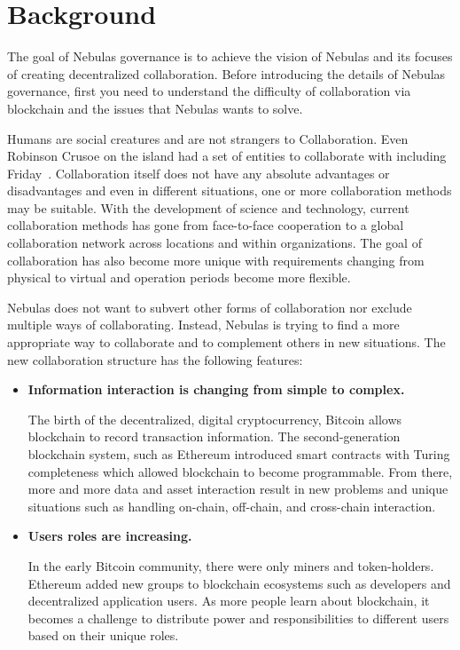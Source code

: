 \section{Background}

The goal of Nebulas governance is to achieve the vision of Nebulas and its focuses of creating decentralized collaboration. Before introducing the details of Nebulas governance, first you need to understand the difficulty of collaboration via blockchain and the issues that Nebulas wants to solve.

\label{background}

Humans are social creatures and are not strangers to Collaboration. Even Robinson Crusoe on the island had a set of entities to collaborate with including Friday~\cite{robinson}. Collaboration itself does not have any absolute advantages or disadvantages and even in different situations, one or more collaboration methods may be suitable. With the development of science and technology, current collaboration methods has gone from face-to-face cooperation to a global collaboration network across locations and within organizations. The goal of collaboration has also become more unique with requirements changing from physical to virtual and operation periods become more flexible.

Nebulas does not want to subvert other forms of collaboration nor exclude multiple ways of collaborating. Instead, Nebulas is trying to find a more appropriate way to collaborate and to complement others in new situations. The new collaboration structure has the following features:

\begin{itemize}
	\item \textbf{Information interaction is changing from simple to complex.}

	The birth of the decentralized, digital cryptocurrency, Bitcoin allows blockchain to record transaction information. The second-generation blockchain system, such as Ethereum introduced smart contracts with Turing completeness which allowed blockchain to become programmable. From there, more and more data and asset interaction result in new problems and unique situations such as handling on-chain, off-chain, and cross-chain interaction.

	\item \textbf{Users roles are increasing.}

	In the early Bitcoin community, there were only miners and token-holders. Ethereum added new groups to blockchain ecosystems such as developers and decentralized application users. As more people learn about blockchain, it becomes a challenge to distribute power and responsibilities to different users based on their unique roles.

\end{itemize}

